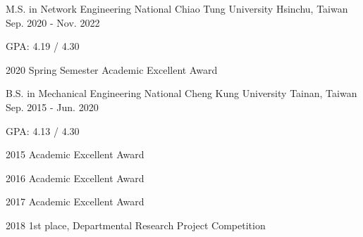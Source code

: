 

\begin{cventries}

  \cventry
    {M.S. in Network Engineering} %
    {National Chiao Tung University} %
    {Hsinchu, Taiwan} %
    {Sep. 2020 - Nov. 2022} %
    {
      \begin{cvitems} %
        \item {GPA: 4.19 / 4.30}
        \item {2020 Spring Semester Academic Excellent Award}
      \end{cvitems}
    }

  \cventry
    {B.S. in Mechanical Engineering} %
    {National Cheng Kung University} %
    {Tainan, Taiwan} %
    {Sep. 2015 - Jun. 2020} %
    {
      \vspace{14pt}
      \begin{cvitems} %
        \item {GPA: 4.13 / 4.30}
        \item {2015 Academic Excellent Award}
        \item {2016 Academic Excellent Award}
        \item {2017 Academic Excellent Award}
        \item {2018 1st place, Departmental Research Project Competition}
      \end{cvitems}
    }

\end{cventries}
